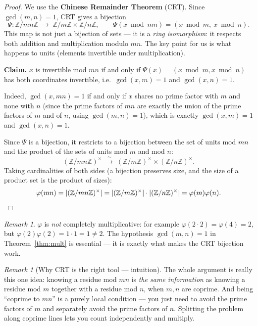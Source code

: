 \documentclass[11pt]{article}
\theoremstyle{definition}
\theoremstyle{remark}
\newtheorem{remark}[theorem]{Remark}
\newcommand{\Z}{\mathbb{Z}}
\begin{document}
\begin{proof}
We use the \textbf{Chinese Remainder Theorem} (CRT). Since $\gcd(m,n)=1$, CRT gives a bijection
\[
\Psi : \Z/mn\Z \;\longrightarrow\; \Z/m\Z \times \Z/n\Z, \qquad \Psi(x \bmod mn) = (x \bmod m,\ x \bmod n).
\]
This map is not just a bijection of sets — it is a \emph{ring isomorphism}: it respects both addition and multiplication modulo $mn$. The key point for us is what happens to units (elements invertible under multiplication).

\medskip
\noindent\textbf{Claim.} $x$ is invertible mod $mn$ if and only if $\Psi(x) = (x \bmod m, x \bmod n)$ has both coordinates invertible, i.e.\ $\gcd(x,m)=1$ and $\gcd(x,n)=1$.

Indeed, $\gcd(x, mn) = 1$ if and only if $x$ shares no prime factor with $m$ and none with $n$ (since the prime factors of $mn$ are exactly the union of the prime factors of $m$ and of $n$, using $\gcd(m,n)=1$), which is exactly $\gcd(x,m) = 1$ and $\gcd(x,n) = 1$.

\medskip
Since $\Psi$ is a bijection, it restricts to a bijection between the set of units mod $mn$ and the product of the sets of units mod $m$ and mod $n$:
\[
(\Z/mn\Z)^{\times} \;\xrightarrow{\ \sim\ }\; (\Z/m\Z)^{\times} \times (\Z/n\Z)^{\times}.
\]
Taking cardinalities of both sides (a bijection preserves size, and the size of a product set is the product of sizes):
\[
\varphi(mn) = |(\Z/mn\Z)^\times| = |(\Z/m\Z)^\times| \cdot |(\Z/n\Z)^\times| = \varphi(m)\varphi(n). \qedhere
\]
\end{proof}

\begin{remark}\label{rem:notcompletelymult}
$\varphi$ is \emph{not} completely multiplicative: for example $\varphi(2\cdot 2) = \varphi(4) = 2$, but $\varphi(2)\varphi(2) = 1 \cdot 1 = 1 \ne 2$. The hypothesis $\gcd(m,n)=1$ in Theorem~\ref{thm:mult} is essential — it is exactly what makes the CRT bijection work.
\end{remark}

\begin{remark}[Why CRT is the right tool — intuition]
The whole argument is really this one idea: knowing a residue mod $mn$ is \emph{the same information} as knowing a residue mod $m$ together with a residue mod $n$, when $m,n$ are coprime. And being ``coprime to $mn$'' is a purely local condition — you just need to avoid the prime factors of $m$ and separately avoid the prime factors of $n$. Splitting the problem along coprime lines lets you count independently and multiply.
\end{remark}
\end{document}
